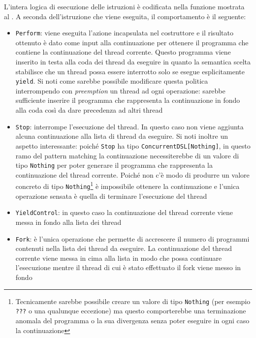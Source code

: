 L'intera logica di esecuzione delle istruzioni è codificata nella funzione mostrata al .
A seconda dell'istruzione che viene eseguita, il comportamento è il seguente:
\begin{itemize}
  \item \lstinline{Perform}: viene eseguita l'azione incapsulata nel costruttore e il risultato ottenuto è dato come input alla continuazione per ottenere il programma che contiene la continuazione del thread corrente. Questo programma viene inserito in testa alla coda dei thread da eseguire in quanto la semantica scelta stabilisce che un thread possa essere interrotto solo se esegue esplicitamente \lstinline{yield}. Si noti come sarebbe possibile modificare questa politica interrompendo con \emph{preemption} un thread ad ogni operazione: sarebbe sufficiente inserire il programma che rappresenta la continuazione in fondo alla coda così da dare precedenza ad altri thread
  \item \lstinline{Stop}: interrompe l'esecuzione del thread. In questo caso non viene aggiunta alcuna continuazione alla lista di thread da eseguire. Si noti inoltre un aspetto interessante: poiché \lstinline{Stop} ha tipo \lstinline{ConcurrentDSL[Nothing]}, in questo ramo del pattern matching la continuazione necessiterebbe di un valore di tipo \lstinline{Nothing} per poter generare il programma che rappresenta la continuazione del thread corrente. Poiché non c'è modo di produrre un valore concreto di tipo \lstinline{Nothing}\footnote{Tecnicamente sarebbe possibile creare un valore di tipo \lstinline{Nothing} (per esempio \lstinline{???} o una qualunque eccezione) ma questo comporterebbe una terminazione anomala del programma o la sua divergenza senza poter eseguire in ogni caso la continuazione} è impossibile ottenere la continuazione e l'unica operazione sensata è quella di terminare l'esecuzione del thread
  \item \lstinline{YieldControl}: in questo caso la continuazione del thread corrente viene messa in fondo alla lista dei thread
  \item \lstinline{Fork}: è l'unica operazione che permette di accrescere il numero di programmi contenuti nella lista dei thread da eseguire. La continuazione del thread corrente viene messa in cima alla lista in modo che possa continuare l'esecuzione mentre il thread di cui è stato effettuato il fork viene messo in fondo
\end{itemize}

